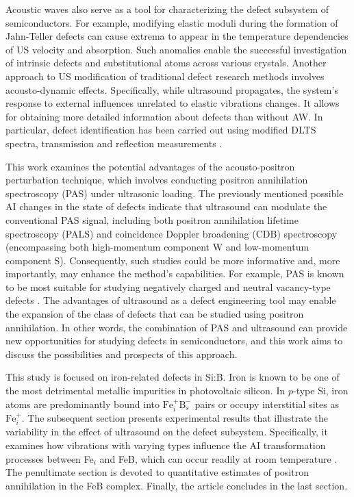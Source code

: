 \documentclass{ttp}
\begin{document}
Acoustic waves also serve as a tool for characterizing the defect subsystem of semiconductors.
For example, modifying elastic moduli during the formation of Jahn-Teller defects can cause extrema to appear in the temperature dependencies of US velocity and absorption.
Such anomalies enable the successful investigation of intrinsic defects \cite{USM:Mitsumoto2014, USM:SEYIDOV2016}
and substitutional atoms \cite{USM:Zhevstovskikh, USM:YI2009} across various crystals.
Another approach to US modification of traditional defect research methods involves acousto-dynamic effects.
Specifically, while ultrasound propagates, the system's response to external influences unrelated to elastic vibrations changes.
It allows for obtaining more detailed information about defects than without AW.
In particular, defect identification has been carried out using modified DLTS spectra,
transmission and reflection measurements \cite{Kor1996, Ostrovskii2001, OSTROVSKII2000, SST:USmethod}.

This work examines the potential advantages of the acousto-positron perturbation technique,
which involves conducting positron annihilation spectroscopy (PAS) under ultrasonic loading.
The previously mentioned possible AI changes in the state of defects indicate that ultrasound can modulate the conventional PAS signal,
including both positron annihilation lifetime spectroscopy (PALS) and coincidence Doppler broadening (CDB) spectroscopy
(encompassing both high-momentum component W and low-momentum component S).
Consequently, such studies could be more informative and, more importantly, may enhance the method's capabilities.
For example, PAS is known to be most suitable for studying negatively charged and neutral vacancy-type defects \cite{Makkonen2024,Tuomisto2013}.
The advantages of ultrasound as a defect engineering tool \cite{Olikh2018JAP} may enable the expansion
of the class of defects that can be studied using positron annihilation.
In other words, the combination of PAS and ultrasound can provide new opportunities for studying defects in semiconductors,
and this work aims to discuss the possibilities and prospects of this approach.

This study is focused on iron-related defects in Si:B.
Iron is known to be one of the most detrimental metallic impurities in photovoltaic silicon.
In $p$-type Si, iron atoms are predominantly bound into $\mathrm{Fe}_i^+\mathrm{B}_s^−$ pairs
or occupy interstitial sites as $\mathrm{Fe}_i^+$.
The subsequent section presents experimental results that illustrate the variability in the effect of ultrasound on the defect subsystem.
Specifically, it examines how vibrations with varying types influence the AI transformation processes
between Fe$_i$ and FeB, which can occur readily at room temperature \cite{FeBAssJAP2014}.
The penultimate section is devoted to quantitative estimates of positron annihilation in the FeB complex.
Finally, the article concludes in the last section.
\end{document}
